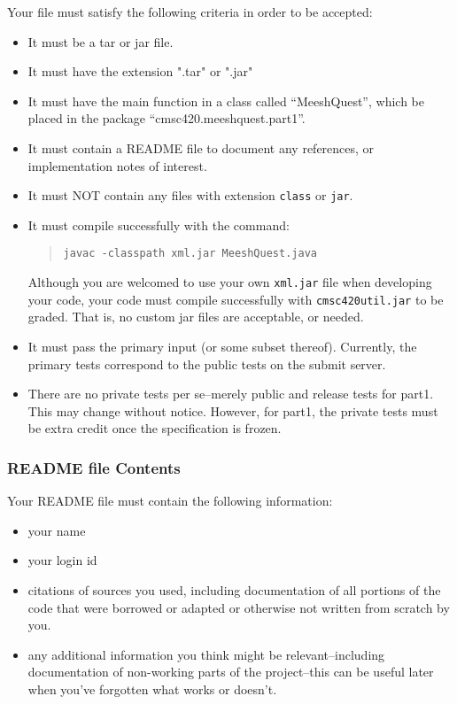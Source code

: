 \documentclass[12pt]{article}
\begin{document}
Your file must  satisfy the following criteria in order to be
accepted:

  
  \begin{itemize}
    \item It must be a  tar or jar file.
    \item It must have the extension ".tar" or ".jar"
    \item It  must have
    the main function in a class called ``MeeshQuest'', which  be placed in the package ``cmsc420.meeshquest.part1''.
    \item 	It must contain  a README file to document any references, or implementation notes of interest. 
    \item 	 It must NOT contain any files with extension \texttt{class} or \texttt{jar}.
  \item It must compile successfully with the command:

\begin{quote}
\begin{verbatim}
javac -classpath xml.jar MeeshQuest.java
\end{verbatim}
\end{quote}

Although you are welcomed to use your own \texttt{xml.jar} file
when developing your code, your code must compile successfully with
\texttt{cmsc420util.jar} to be graded. That is, no custom jar files
are acceptable, or needed.

 \item It must pass the primary input
 (or some subset thereof). Currently,   the primary tests correspond
 to  the public tests on
 the submit server. 
\item  There are no private tests per se--merely public and release tests for part1. This may change without notice. However, for part1, the private tests must be extra credit once the specification is frozen. 
  \end{itemize}

\subsubsection{README file Contents}

Your README file must contain the following information:
\begin{itemize}
  \item your name
  \item your login id
  \item citations of sources you used, including documentation of all
        portions of the code that were borrowed or adapted  or
        otherwise not written from scratch by you.
  \item  any additional information you think might be
        relevant--including documentation of non-working parts of the
        project--this can be useful later when you've forgotten what
        works or doesn't.
\end{itemize}
\end{document}
